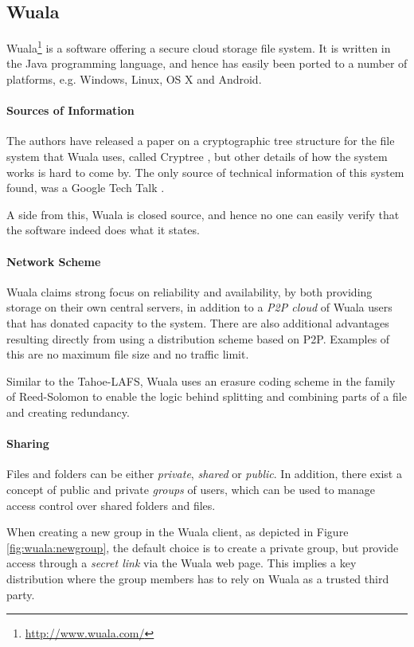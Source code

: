 \documentclass[pdftex,english,10pt,b5paper,twoside]{book}
\begin{document}
\subsection{Wuala}

Wuala\footnote{\url{http://www.wuala.com/}} is a software offering a secure
cloud storage file system. It is written in the Java programming language, and
hence has easily been ported to a number of platforms, e.g. Windows, Linux, OS
X and Android.

\paragraph{Sources of Information} The authors have released a paper on a
cryptographic tree structure for the file system that Wuala uses, called
Cryptree \cite{cryptree}, but other details of how the system works is hard to
come by. The only source of technical information of this system found, was a
Google Tech Talk \cite{wuala}.

A side from this, Wuala is closed source, and hence no one can easily verify that the
software indeed does what it states.

\paragraph{Network Scheme} Wuala claims strong focus on reliability and
availability, by both providing storage on their own central servers, in
addition to a \emph{\ac{P2P} cloud} of Wuala users that has donated capacity to
the system. There are also additional advantages resulting directly from using
a distribution scheme based on \ac{P2P}.  Examples of this are no maximum file
size and no traffic limit.

Similar to the Tahoe-\ac{LAFS}, Wuala uses an erasure coding scheme in the
family of Reed-Solomon \cite{wuala} to enable the logic behind splitting and
combining parts of a file and creating redundancy.

\paragraph{Sharing} Files and folders can be either \emph{private},
\emph{shared} or \emph{public}. In addition, there exist a concept of public
and private \emph{groups} of users, which can be used to manage access control
over shared folders and files.

When creating a new group in the Wuala client, as depicted in Figure
\ref{fig:wuala:newgroup}, the default choice is to create a private group, but
provide access through a \emph{secret link} via the Wuala web page.
This implies a key distribution where the group members has to rely on Wuala as
a trusted third party.
\end{document}
